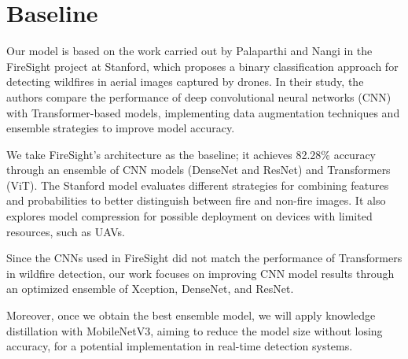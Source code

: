 \section{Baseline}
\label{sec:baseline}

Our model is based on the work carried out by Palaparthi and Nangi in the FireSight project
at Stanford, which proposes a binary classification approach for detecting wildfires in
aerial images captured by drones.
In their study, the authors compare the performance of
deep convolutional neural networks (CNN) with Transformer-based models, implementing data
augmentation techniques and ensemble strategies to improve model accuracy.

We take FireSight's architecture as the baseline; it achieves 82.28\% accuracy through
an ensemble of CNN models (DenseNet and ResNet) and Transformers (ViT). The Stanford model
evaluates different strategies for combining features and probabilities to better
distinguish between fire and non-fire images.
It also explores model compression for possible deployment on devices with limited resources, such as UAVs.

Since the CNNs used in FireSight did not match the performance of Transformers in wildfire
detection, our work focuses on improving CNN model results through an optimized ensemble
of Xception, DenseNet, and ResNet.

Moreover, once we obtain the best ensemble model, we will apply knowledge distillation with
MobileNetV3, aiming to reduce the model size without losing accuracy, for a potential
implementation in real-time detection systems.
